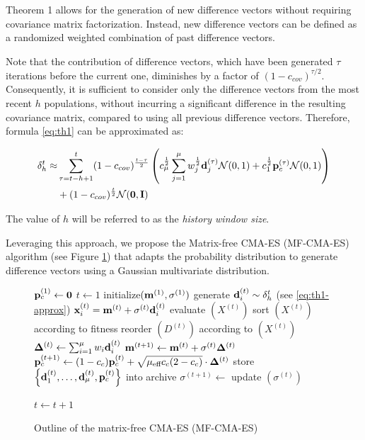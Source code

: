 \documentclass[dvipsnames,format=sigconf,anonymous=false,review=false]{acmart}
\begin{document}
Theorem 1 allows for the generation of new difference vectors without requiring covariance matrix factorization. Instead, new difference vectors can be defined as a randomized weighted combination of past difference vectors. 

Note that the contribution of difference vectors, which have been generated $\tau$ iterations before the current one, diminishes by a factor of $(1 - c_{cov})^{\tau/2}$. Consequently, it is sufficient to consider only the difference vectors from the most recent $h$ populations, without incurring a significant difference in the resulting covariance matrix, compared to using all previous difference vectors. Therefore, formula \eqref{eq:th1} can be approximated as:

\begin{align}
{\bf \delta}_h^{t}\approx&\sum_{\tau=t-h+1}^{t}(1-c_{cov})^{\frac{t-\tau}{2}} \left(c_\mu^{\frac{1}{2}} \sum_{j=1}^\mu w_j^{\frac{1}{2}} {\bf d}_j^{(\tau)}  {\mathcal N}(0,1) + c_1^{\frac{1}{2}} {\bf p}_c^{(\tau)} {\mathcal N}(0,1)\right) \nonumber \\
& +(1-c_{cov})^\frac{t}{2} {\mathcal N}({\bf 0},{\bf I})
\label{eq:th1-approx}
\end{align}

The value of $h$ will be referred to as the \textit{history window size}.

Leveraging this approach, we propose the Matrix-free CMA-ES (MF-CMA-ES)  algorithm (see Figure \ref{alg:nm-cmaes}) that adapts the probability distribution to generate difference vectors using a Gaussian multivariate distribution.

\begin{figure}[h!]
\begin{algorithmic}[1]
\STATE ${\bf p}_c^{(1)} \gets {\bf 0}$
\STATE $t \gets 1$
\STATE initialize$({\bf m}^{(1)},\sigma^{(1)})$
      \STATE generate $ {\bf d}_i^{(t)} \sim {\bf \delta}_h^{t}$ (see \eqref{eq:th1-approx})
      \STATE $ {\bf x}_i^{(t)} = {\bf m}^{(t)} + \sigma^{(t)} {\bf d}_i^{(t)} $
   \ENDFOR
   \STATE evaluate $(X^{(t)})$
   \STATE sort $(X^{(t)})$ according to fitness
   \STATE reorder $(D^{(t)})$ according to $(X^{(t)})$   
   \STATE ${\bf \Delta}^{(t)} \gets \sum_{i=1}^\mu w_i {\bf d}_i^{(t)} $
   \STATE ${\bf m}^{(t+1)} \gets {\bf m}^{(t)} + \sigma^{(t)} {\bf \Delta}^{(t)}$
   \STATE ${\bf p}_c^{(t+1)} \gets (1-c_c){\bf p}_c^{(t)} + \sqrt{\mu_\text{eff} c_c(2-c_c)} \cdot {\bf \Delta}^{(t)}$
   \STATE store $\left\{ {\bf d}_1^{(t)}, \ldots, {\bf d}_\mu^{(t)}, {\bf p}_c^{(t)} \right\}$ into archive
   \STATE $\sigma^{(t+1)} \gets $ update $(\sigma^{(t)} )   $
      
   \STATE $t \gets t+1$
\ENDWHILE

\end{algorithmic}
\caption{Outline of the matrix-free CMA-ES (MF-CMA-ES)}
\label{alg:nm-cmaes}
\end{figure}
\end{document}
